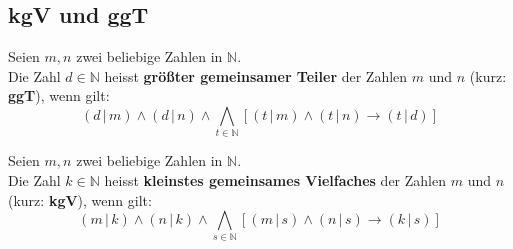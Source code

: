 \documentclass[]{beamer}
\begin{document}
\subsection{kgV und ggT}
\begin{frame}[<+->][squeeze]{}
  \begin{definition}
    Seien $m, n$ zwei beliebige Zahlen in $\mathbb{N}$.
    \vspace*{0.5em}\\
    Die Zahl $d \in \mathbb{N}$ heisst \textbf{größter gemeinsamer Teiler} der Zahlen $m$ und $n$ (kurz: \textbf{ggT}), wenn gilt:
    \[\left( d \, | \, m \right) \land \left( d \, | \, n \right) \land \underset{t \in \mathbb{N}}{\bigwedge} \left[ \left( t \, | \, m \right) \land \left( t \, | \, n \right) \rightarrow \left( t \, | \, d \right) \right]\]
  \end{definition}
  
  \begin{definition}
    Seien $m, n$ zwei beliebige Zahlen in $\mathbb{N}$. \vspace*{0.5em}
    \\
    Die Zahl $k \in \mathbb{N}$ heisst \textbf{kleinstes gemeinsames Vielfaches} der Zahlen $m$ und $n$ (kurz: \textbf{kgV}), wenn gilt:
    \[\left( m \, | \, k \right) \land \left( n \, | \, k \right) \land \underset{s \in \mathbb{N}}{\bigwedge} \left[ \left( m \, | \, s \right) \land \left( n \, | \, s \right) \rightarrow \left( k \, | \, s \right) \right]\]
  \end{definition}
\end{frame}
\end{document}
